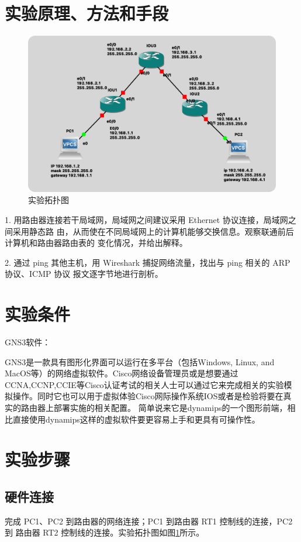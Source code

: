 \documentclass[a4paper,12pt]{report}
\begin{document}
\begin{spacing}{1.5}
\section{实验原理、方法和手段}
\begin{figure}[htb!]
  \centering
\includegraphics[width=12cm]{figure/1.png}
\caption{实验拓扑图}
\label{1}
\end{figure}
1. 用路由器连接若干局域网，局域网之间建议采用 Ethernet 协议连接，局域网之间采用静态路 由，从而使在不同局域网上的计算机能够交换信息。观察联通前后计算机和路由器路由表的 变化情况，并给出解释。

2. 通过 ping 其他主机，用 Wireshark 捕捉网络流量，找出与 ping 相关的 ARP 协议、ICMP 协议 报文逐字节地进行剖析。

\section{实验条件}
GNS3软件：

GNS3是一款具有图形化界面可以运行在多平台（包括Windows, Linux, and MacOS等）的网络虚拟软件。Cisco网络设备管理员或是想要通过CCNA,CCNP,CCIE等Cisco认证考试的相关人士可以通过它来完成相关的实验模拟操作。同时它也可以用于虚拟体验Cisco网际操作系统IOS或者是检验将要在真实的路由器上部署实施的相关配置。
简单说来它是dynamips的一个图形前端，相比直接使用dynamips这样的虚拟软件要更容易上手和更具有可操作性。

\section{实验步骤}

\subsection{硬件连接}
完成 PC1、PC2 到路由器的网络连接；PC1 到路由器 RT1 控制线的连接，PC2 到 路由器 RT2 控制线的连接。实验拓扑图如图\ref{1}所示。

\end{spacing}
\end{document}
